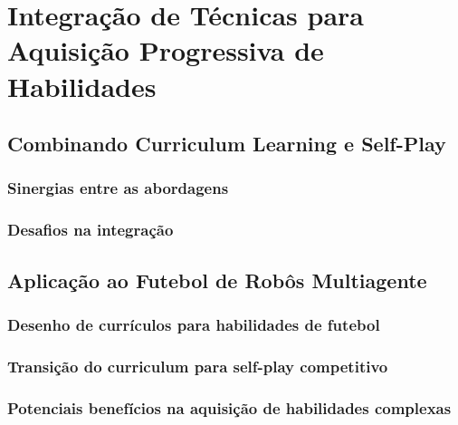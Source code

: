 \section{Integração de Técnicas para Aquisição Progressiva de Habilidades}
\label{sec:integracao}

\subsection{Combinando Curriculum Learning e Self-Play}
\label{subsec:combinacao}

\subsubsection{Sinergias entre as abordagens}
\label{subsubsec:sinergias}

\subsubsection{Desafios na integração}
\label{subsubsec:desafios_integracao}

\subsection{Aplicação ao Futebol de Robôs Multiagente}
\label{subsec:aplicacao_futebol}

\subsubsection{Desenho de currículos para habilidades de futebol}
\label{subsubsec:curriculos_futebol}

\subsubsection{Transição do curriculum para self-play competitivo}
\label{subsubsec:transicao_self_play}

\subsubsection{Potenciais benefícios na aquisição de habilidades complexas}
\label{subsubsec:beneficios_aquisicao}